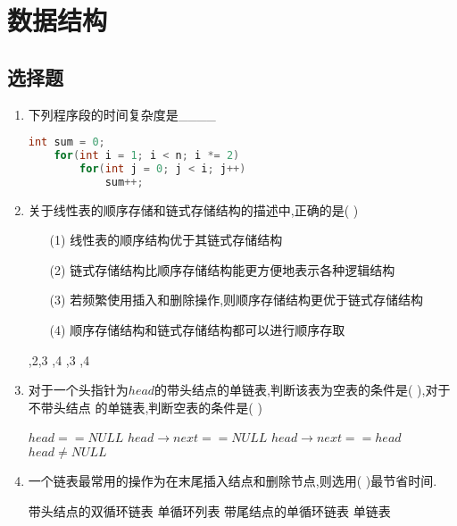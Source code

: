 \documentclass[12pt, a4paper, oneside, UTF8]{ctexbook}
\begin{document}
% 
\else
\fi
\chapter{数据结构}
\section{选择题}
\begin{enumerate}
    \item \bt 下列程序段的时间复杂度是\_\_\_\_ 
    \begin{lstlisting}[language=C]
int sum = 0;
    for(int i = 1; i < n; i *= 2)
        for(int j = 0; j < i; j++)
            sum++;
    \end{lstlisting}


    \item 关于线性表的顺序存储和链式存储结构的描述中,正确的是(    ) 
    \begin{enumerate}
        \item [(1)] 线性表的顺序结构优于其链式存储结构
        \item [(2)] 链式存储结构比顺序存储结构能更方便地表示各种逻辑结构
        \item [(3)] 若频繁使用插入和删除操作,则顺序存储结构更优于链式存储结构
        \item [(4)] 顺序存储结构和链式存储结构都可以进行顺序存取 
    \end{enumerate}
    \begin{choices}
        ,2,3
        ,4
        ,3
        ,4
    \end{choices}
    \item 对于一个头指针为$head$的带头结点的单链表,判断该表为空表的条件是(   ),对于不带头结点
    的单链表,判断空表的条件是(   ) 
    \begin{choices}[2]
        \task $head == NULL$ 
        \task $head\rightarrow next == NULL$ 
        \task $head\rightarrow next == head$ 
        \task $head \neq NULL$
    \end{choices}

    \item 一个链表最常用的操作为在末尾插入结点和删除节点,则选用(   )最节省时间. 
    \begin{choices}[2]
        \task 带头结点的双循环链表
        \task 单循环列表
        \task 带尾结点的单循环链表
        \task 单链表
    \end{choices}


\end{enumerate}
\end{document}
